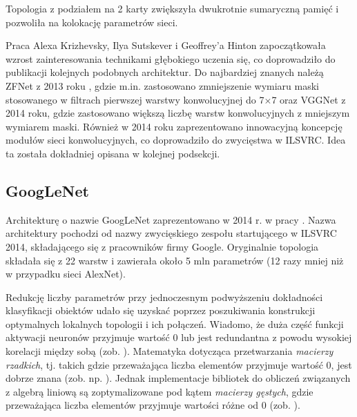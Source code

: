 Topologia z podziałem na 2 karty zwiększyła dwukrotnie sumaryczną pamięć i pozwoliła na kolokację parametrów sieci.

Praca Alexa Krizhevsky, Ilya Sutskever i Geoffrey'a Hinton zapoczątkowała wzrost zainteresowania technikami głębokiego uczenia się, co doprowadziło do publikacji kolejnych podobnych architektur. Do najbardziej znanych należą ZFNet z 2013 roku \cite{ZFNet}, gdzie m.in. zastosowano zmniejszenie wymiaru maski stosowanego w filtrach pierwszej warstwy konwolucyjnej do 7$\times$7 oraz VGGNet \cite{VGGNet} z 2014 roku, gdzie zastosowano większą liczbę warstw konwolucyjnych z mniejszym wymiarem maski. Również w 2014 roku zaprezentowano innowacyjną koncepcję modułów sieci konwolucyjnych, co doprowadziło do zwycięstwa w ILSVRC. Idea ta została dokładniej opisana w kolejnej podsekcji.

\subsection{GoogLeNet}
\label{googlenet}
Architekturę o nazwie GoogLeNet zaprezentowano w 2014 r. w pracy \cite{GoogleNet}. Nazwa architektury pochodzi od nazwy zwycięskiego zespołu startującego w ILSVRC 2014, składającego się z pracowników firmy Google. Oryginalnie topologia składała się z 22 warstw i zawierała około 5 mln parametrów (12 razy mniej niż w przypadku sieci AlexNet). 

Redukcję liczby parametrów przy jednoczesnym podwyższeniu dokładności klasyfikacji obiektów udało się uzyskać poprzez poszukiwania konstrukcji optymalnych lokalnych topologii i ich połączeń. Wiadomo, że duża część funkcji aktywacji neuronów przyjmuje wartość 0 lub jest redundantna z powodu wysokiej korelacji między sobą (zob. \cite{DBLP:journals/corr/AroraBGM13}). Matematyka dotycząca przetwarzania \textit{macierzy rzadkich}, tj. takich gdzie przeważająca liczba elementów przyjmuje wartość 0, jest dobrze znana (zob. np. \cite{Umit2010}). Jednak implementacje bibliotek do obliczeń związanych z algebrą liniową są zoptymalizowane pod kątem \textit{macierzy gęstych}, gdzie przeważająca liczba elementów przyjmuje wartości różne od 0 (zob. \cite{Song:2014:SUM:2597652.2597670, Krizhevsky2012}). 

